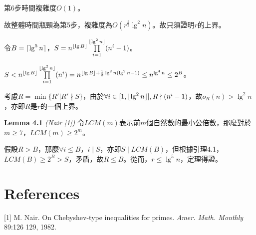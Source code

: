 \documentclass{article}
\DeclarePairedDelimiter\ceil{\lceil}{\rceil}
\DeclarePairedDelimiter\floor{\lfloor}{\rfloor}
\begin{document}
    第6步時間複雜度$O(1)$。

    故整體時間瓶頸為第5步，複雜度為$O(r^{\frac{5}{2}}\lg^2n)$。故只須證明$r$的上界。

    令$B=\ceil{\lg^5n}$，$S=n^{\floor{\lg B}}\prod\limits_{i=1}^{\floor{\lg^2n}}(n^i-1)$。

    $S<n^{\floor{\lg B}}\prod\limits_{i=1}^{\floor{\lg^2n}}(n^i)=n^{\floor{\lg B}+\frac{1}{2}\lg^2n(\lg^2n-1)}\leq n^{\lg^4n}\leq 2^B$。

    考慮$R=\min\{R'|R'\nmid S\}$，由於$\forall i\in[1, \floor{\lg^2n}], R\nmid(n^i-1)$，故$o_R(n)>\lg^2n$，亦即$R$是$r$的一個上界。

\begin{mdframed}
\noindent\textbf{Lemma 4.1} \textit{(Nair [1])} 令$LCM(m)$表示前$m$個自然數的最小公倍數，那麼對於$m\geq 7$，$LCM(m)\geq 2^m$。
\end{mdframed}

    假設$R>B$，那麼$\forall i\leq B$，$i\mid S$，亦即$S\mid LCM(B)$，但根據引理4.1，$LCM(B)\geq 2^B>S$，矛盾，故$R\leq B$。從而，$r\leq \lg^5n$，定理得證。

\section{References}

    [1] M. Nair. On Chebyshev-type inequalities for primes. \textit{Amer. Math. Monthly} 89:126 129, 1982.
    
\end{document}
